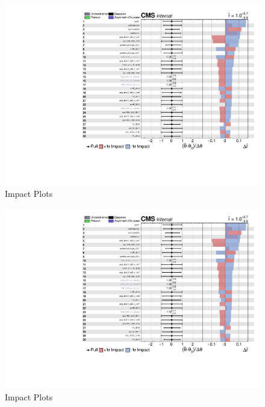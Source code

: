 \begin{figure}[!ht]
  \centering
  \includegraphics[width=\textwidth,page=2]{analysis_plots/impact_plots/impacts_datacard_run2_z.pdf}
  \caption[Impact Plots]%
  {Impact Plots}%
  \label{fig:vbs-impact-plots-page2}
\end{figure}

\begin{figure}[!ht]
  \centering
  \includegraphics[width=\textwidth,page=3]{analysis_plots/impact_plots/impacts_datacard_run2_z.pdf}
  \caption[Impact Plots]%
  {Impact Plots}%
  \label{fig:vbs-impact-plots-page3}
\end{figure}

